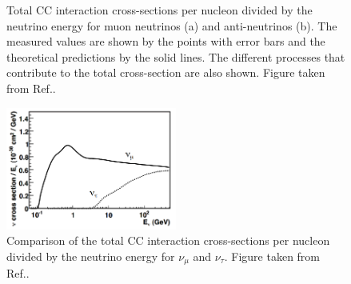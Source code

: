 \begin{figure} %
    \centering
    \quad
    \caption[The caption]
    {Total CC interaction cross-sections per nucleon divided by the neutrino energy for muon
        neutrinos (a) and anti-neutrinos (b). The measured values are shown by the points with
        error bars and the theoretical predictions by the solid lines. The different processes
        that contribute to the total cross-section are also shown. Figure taken from
        Ref.\cite{formaggio2012}.}
    \label{fig:cross_sections}
\end{figure}

\begin{figure} %
    \includegraphics[origin=c,width=0.5\textwidth]{diagrams/4-exp/tau_comparison.png}
    \caption[tau comparison short]
    {Comparison of the total CC interaction cross-sections per nucleon divided by the neutrino
        energy for $\nu_{\mu}$ and $\nu_{\tau}$. Figure taken from Ref.\cite{formaggio2012}.}
    \label{fig:tau_comparison}
\end{figure}

